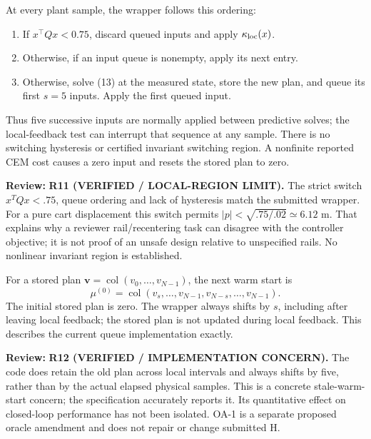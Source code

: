 \documentclass[11pt]{article}
\newcommand{\col}{\operatorname{col}}
\newcommand{\review}[1]{\par\noindent\textcolor{red!70!black}{\textbf{Review:} #1}\par}
\begin{document}
At every plant sample, the wrapper follows this ordering:
\begin{enumerate}
\item If $x^\top Qx<0.75$, discard queued inputs and apply $\kappa_{\rm loc}(x)$.
\item Otherwise, if an input queue is nonempty, apply its next entry.
\item Otherwise, solve (13) at the measured state, store the new plan, and queue its first $s=5$ inputs. Apply the first queued input.
\end{enumerate}
Thus five successive inputs are normally applied between predictive solves; the local-feedback test can interrupt that sequence at any sample. There is no switching hysteresis or certified invariant switching region. A nonfinite reported CEM cost causes a zero input and resets the stored plan to zero.
\review{\textbf{R11 (VERIFIED / LOCAL-REGION LIMIT).} The strict switch $x^TQx<.75$, queue ordering and lack of hysteresis match the submitted wrapper. For a pure cart displacement this switch permits $|p|<\sqrt{.75/.02}\simeq6.12$ m. That explains why a reviewer rail/recentering task can disagree with the controller objective; it is not proof of an unsafe design relative to unspecified rails. No nonlinear invariant region is established.}


For a stored plan $\mathbf v=\col(v_0,\ldots,v_{N-1})$, the next warm start is
\begin{equation}\label{eq:warmstart}
\mu^{(0)}=\col(v_s,\ldots,v_{N-1},v_{N-s},\ldots,v_{N-1}).
\end{equation}
The initial stored plan is zero. The wrapper always shifts by $s$, including after leaving local feedback; the stored plan is not updated during local feedback. This describes the current queue implementation exactly.
\review{\textbf{R12 (VERIFIED / IMPLEMENTATION CONCERN).} The code does retain the old plan across local intervals and always shifts by five, rather than by the actual elapsed physical samples. This is a concrete stale-warm-start concern; the specification accurately reports it. Its quantitative effect on closed-loop performance has not been isolated. OA-1 is a separate proposed oracle amendment and does not repair or change submitted H.}
\end{document}
